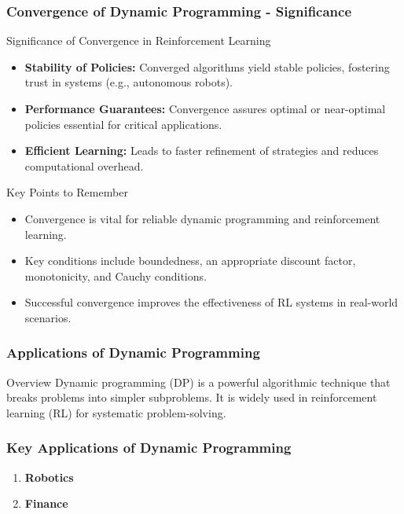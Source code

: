 \documentclass{beamer}
\begin{document}
\begin{frame}[fragile]
    \frametitle{Convergence of Dynamic Programming - Significance}
    \begin{block}{Significance of Convergence in Reinforcement Learning}
        \begin{itemize}
            \item \textbf{Stability of Policies:} Converged algorithms yield stable policies, fostering trust in systems (e.g., autonomous robots).
            \item \textbf{Performance Guarantees:} Convergence assures optimal or near-optimal policies essential for critical applications.
            \item \textbf{Efficient Learning:} Leads to faster refinement of strategies and reduces computational overhead.
        \end{itemize}
    \end{block}

    \begin{block}{Key Points to Remember}
        \begin{itemize}
            \item Convergence is vital for reliable dynamic programming and reinforcement learning.
            \item Key conditions include boundedness, an appropriate discount factor, monotonicity, and Cauchy conditions.
            \item Successful convergence improves the effectiveness of RL systems in real-world scenarios.
        \end{itemize}
    \end{block}
\end{frame}

\begin{frame}[fragile]
    \frametitle{Applications of Dynamic Programming}
    
    \begin{block}{Overview}
        Dynamic programming (DP) is a powerful algorithmic technique that breaks problems into simpler subproblems. It is widely used in reinforcement learning (RL) for systematic problem-solving.
    \end{block}
\end{frame}

\begin{frame}[fragile]
    \frametitle{Key Applications of Dynamic Programming}
    
    \begin{enumerate}
        \item \textbf{Robotics}
        \item \textbf{Finance}
    \end{enumerate}
\end{frame}
\end{document}
